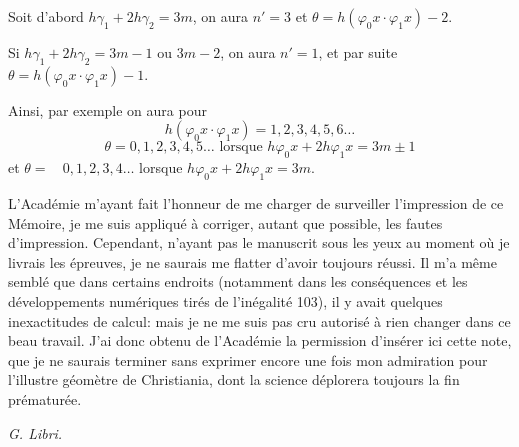 \documentclass{article}
\begin{document}
Soit d'abord $h\gamma_1+2h\gamma_2 = 3m$, on aura $n'=3$ et $\theta = h(\varphi_0 x \cdot \varphi_1 x)-2$.

Si $h\gamma_1+2h\gamma_2 = 3m-1$ ou $3m-2$, on aura $n'=1$, et par suite $\theta = h(\varphi_0 x \cdot \varphi_1 x)-1$.

Ainsi, par exemple on aura pour
\[ h(\varphi_0 x \cdot \varphi_1 x) = 1, 2, 3, 4, 5, 6 \ldots \]
\[ \theta = 0, 1, 2, 3, 4, 5 \ldots \text{ lorsque } h\varphi_0 x+2h\varphi_1 x = 3m \pm 1 \]
et $\theta = \phantom{0, }0, 1, 2, 3, 4 \ldots$ lorsque $h\varphi_0 x+2h\varphi_1 x = 3m$.

L'Académie m'ayant fait l'honneur de me charger de surveiller l'impression de ce Mémoire, je me suis appliqué à corriger, autant que possible, les fautes d'impression. Cependant, n'ayant pas le manuscrit sous les yeux au moment où je livrais les épreuves, je ne saurais me flatter d'avoir toujours réussi. Il m'a même semblé que dans certains endroits (notamment dans les conséquences et les développements numériques tirés de l'inégalité 103), il y avait quelques inexactitudes de calcul: mais je ne me suis pas cru autorisé à rien changer dans ce beau travail. J'ai donc obtenu de l'Académie la permission d'insérer ici cette note, que je ne saurais terminer sans exprimer encore une fois mon admiration pour l'illustre géomètre de Christiania, dont la science déplorera toujours la fin prématurée.

\emph{G. Libri.}
\end{document}
